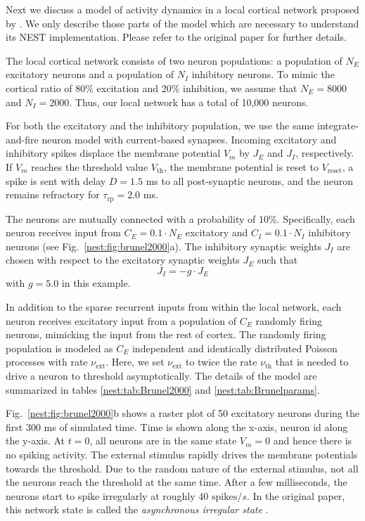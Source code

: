 \documentclass{article}
\begin{document}
Next we discuss a model of activity dynamics in a local cortical
network proposed by \citet{Brunel00}. We only describe those parts of
the model which are necessary to understand its NEST
implementation. Please refer to the original paper for further details.

The local cortical network consists of two neuron populations: a
population of $N_E$ excitatory neurons and a population of $N_I$
inhibitory neurons. To mimic the cortical ratio of 80\% excitation
and 20\% inhibition, we assume that $N_E=8000$ and $N_I=2000$. Thus,
our local network has a total of 10,000 neurons.

For both the excitatory and the inhibitory population, we use the same
integrate-and-fire neuron model with current-based synapses. Incoming
excitatory and inhibitory spikes displace the membrane potential $V_m$
by $J_{E}$ and $J_I$, respectively. If $V_m$ reaches the threshold
value $V_{\text{th}}$, the membrane potential is reset to $V_{\text{reset}}$,
a spike is sent with delay $D=1.5$ ms to all post-synaptic
neurons, and the neuron remains refractory for $\tau_{\text{rp}}=2.0$ ms.

The neurons are mutually connected with a probability of
10\%. Specifically, each neuron receives input from $C_{E}= 0.1 \cdot
N_{E}$ excitatory and $C_I= 0.1 \cdot N_{I}$ inhibitory neurons (see
Fig.~\ref{nest:fig:brunel2000}a). The inhibitory synaptic weights
$J_I$ are chosen with respect to the excitatory synaptic weights $J_E$
such that
\begin{equation}
J_I = -g \cdot J_E
\end{equation}
with $g=5.0$ in this example.

In addition to the sparse recurrent inputs from within the local
network, each neuron receives excitatory input from a population of
$C_E$ randomly firing neurons, mimicking the input from the rest of
cortex.  The randomly firing population is modeled as $C_E$
independent and identically distributed Poisson processes with rate
$\nu_{\text{ext}}$. Here, we set $\nu_{\text{ext}}$ to twice the rate $\nu_{\text{th}}$
that is needed to drive a neuron to threshold asymptotically. The
details of the model are summarized in tables
\ref{nest:tab:Brunel2000} and \ref{nest:tab:Brunelparams}.

Fig.~\ref{nest:fig:brunel2000}b shows a raster plot of 50
excitatory neurons during the first 300 ms of simulated time. Time is
shown along the x-axis, neuron id along the y-axis. At $t=0$, all
neurons are in the same state $V_m=0$ and hence there is no spiking
activity. The external stimulus rapidly drives the membrane potentials
towards the threshold. Due to the random nature of the external
stimulus, not all the neurons reach the threshold at the same
time. After a few milliseconds, the neurons start to spike irregularly at
roughly 40 $\mathrm{spikes}/s$. In the original paper, this network
state is called the \emph{asynchronous irregular state} \citep{Brunel00}.
\end{document}
